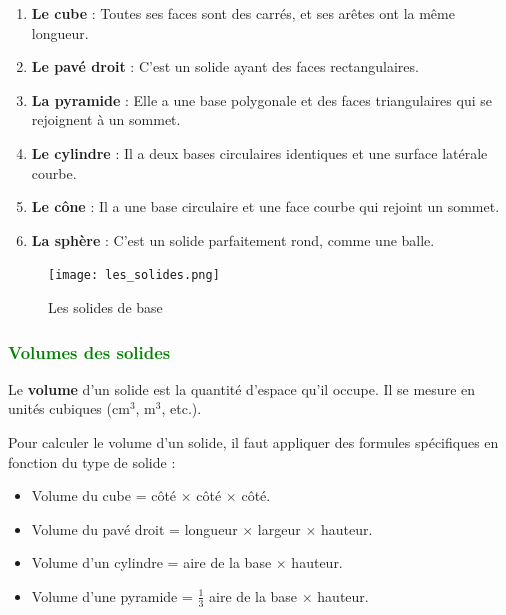 \documentclass{article}
\begin{document}
\begin{tcolorbox}[colback=orange!10!white, colframe=orange!75!black, title=\textcolor{white}{Exemples de solides}, sharp corners=south]
    \begin{enumerate}
        \item \textbf{Le cube} : Toutes ses faces sont des carrés, et ses arêtes ont la même longueur.
        \item \textbf{Le pavé droit} : C'est un solide ayant des faces rectangulaires.
        \item \textbf{La pyramide} : Elle a une base polygonale et des faces triangulaires qui se rejoignent à un sommet.
        \item \textbf{Le cylindre} : Il a deux bases circulaires identiques et une surface latérale courbe.
        \item \textbf{Le cône} : Il a une base circulaire et une face courbe qui rejoint un sommet.
        \item \textbf{La sphère} : C'est un solide parfaitement rond, comme une balle.
    \end{enumerate}
\end{tcolorbox}

\begin{figure}[H]
    \centering
    \texttt{[image: les\_solides.png]}
    \caption{Les solides de base}
    \label{fig:enter-label}
\end{figure}

\subsubsection{\textcolor{green}{Volumes des solides}}

\begin{tcolorbox}[colback=red!10!white, colframe=red!75!black, title=\textcolor{white}{Définition : Volume}, sharp corners=south]
    Le \textbf{volume} d'un solide est la quantité d'espace qu'il occupe. Il se mesure en unités cubiques (cm$^3$, m$^3$, etc.).
\end{tcolorbox}

\vspace{0.1cm}

\begin{tcolorbox}[colback=purple!10!white, colframe=purple!75!black, title=\textcolor{white}{Note}, sharp corners=south]
    Pour calculer le volume d'un solide, il faut appliquer des formules spécifiques en fonction du type de solide :
    \begin{itemize}
        \item Volume du cube = côté $\times$ côté $\times$ côté.
        \item Volume du pavé droit = longueur $\times$ largeur $\times$ hauteur.
        \item Volume d'un cylindre = aire de la base $\times$ hauteur.
        \item Volume d'une pyramide = $\frac{1}{3}$ aire de la base $\times$ hauteur.
    \end{itemize}
\end{tcolorbox}
\end{document}
